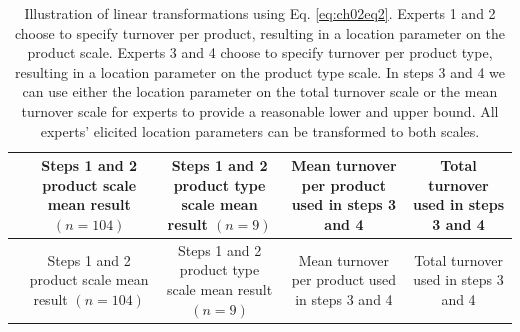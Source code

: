 \documentclass[openright,titlepage,12pt,a4paper]{book}
\begin{document}
\begin{longtable}[]{@{}lcccc@{}}
\caption{\label{tab:ch02tab2} Illustration of linear transformations using Eq. \eqref{eq:ch02eq2}. Experts 1 and 2 choose to specify turnover per product, resulting in a location parameter on the product scale. Experts 3 and 4 choose to specify turnover per product type, resulting in a location parameter on the product type scale. In steps 3 and 4 we can use either the location parameter on the total turnover scale or the mean turnover scale for experts to provide a reasonable lower and upper bound. All experts' elicited location parameters can be transformed to both scales.}\tabularnewline
\toprule
\begin{minipage}[b]{0.16\columnwidth}\raggedright
\strut
\end{minipage} & \begin{minipage}[b]{0.16\columnwidth}\centering
Steps 1 and 2
product scale
mean result
\((n=104)\)\strut
\end{minipage} & \begin{minipage}[b]{0.17\columnwidth}\centering
Steps 1 and 2
product type
scale mean
result \((n=9)\)\strut
\end{minipage} & \begin{minipage}[b]{0.17\columnwidth}\centering
Mean turnover
per product
used in steps
3 and 4\strut
\end{minipage} & \begin{minipage}[b]{0.17\columnwidth}\centering
Total turnover
used in steps
3 and 4\strut
\end{minipage}\tabularnewline
\midrule
\endfirsthead
\toprule
\begin{minipage}[b]{0.16\columnwidth}\raggedright
\strut
\end{minipage} & \begin{minipage}[b]{0.16\columnwidth}\centering
Steps 1 and 2
product scale
mean result
\((n=104)\)\strut
\end{minipage} & \begin{minipage}[b]{0.17\columnwidth}\centering
Steps 1 and 2
product type
scale mean
result \((n=9)\)\strut
\end{minipage} & \begin{minipage}[b]{0.17\columnwidth}\centering
Mean turnover
per product
used in steps
3 and 4\strut
\end{minipage} & \begin{minipage}[b]{0.17\columnwidth}\centering
Total turnover
used in steps
3 and 4\strut
\end{minipage}\tabularnewline

\end{longtable}
\end{document}
